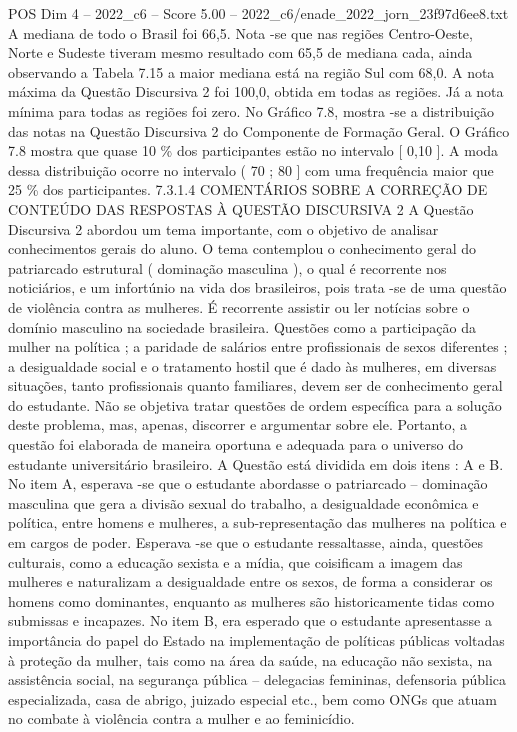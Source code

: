 \begin{textsample}{POS Dim 4 – 2022\_c6 – Score 5.00 – 2022\_c6/enade\_2022\_jorn\_23f97d6ee8.txt}
A mediana de todo o Brasil foi 66,5.
Nota -se que nas regiões Centro-Oeste, Norte e Sudeste tiveram mesmo resultado com 65,5 de mediana cada, ainda observando a Tabela 7.15 a maior mediana está na região Sul com 68,0.
A nota máxima da Questão Discursiva 2 foi 100,0, obtida em todas as regiões.
Já a nota mínima para todas as regiões foi zero.
No Gráfico 7.8, mostra -se a distribuição das notas na Questão Discursiva 2 do Componente de Formação Geral.
O Gráfico 7.8 mostra que quase 10 \% dos participantes estão no intervalo [ 0,10 ].
A moda dessa distribuição ocorre no intervalo ( 70 ; 80 ] com uma frequência maior que 25 \% dos participantes. 7.3.1.4 COMENTÁRIOS SOBRE A CORREÇÃO DE CONTEÚDO DAS RESPOSTAS À QUESTÃO DISCURSIVA 2 A Questão Discursiva 2 abordou um tema importante, com o objetivo de analisar conhecimentos gerais do aluno.
O tema contemplou o conhecimento geral do patriarcado estrutural ( dominação masculina ), o qual é recorrente nos noticiários, e um infortúnio na vida dos brasileiros, pois trata -se de uma questão de violência contra as mulheres.
É recorrente assistir ou ler notícias sobre o domínio masculino na sociedade brasileira.
Questões como a participação da mulher na política ; a paridade de salários entre profissionais de sexos diferentes ; a desigualdade social e o tratamento hostil que é dado às mulheres, em diversas situações, tanto profissionais quanto familiares, devem ser de conhecimento geral do estudante.
Não se objetiva tratar questões de ordem específica para a solução deste problema, mas, apenas, discorrer e argumentar sobre ele.
Portanto, a questão foi elaborada de maneira oportuna e adequada para o universo do estudante universitário brasileiro.
A Questão está dividida em dois itens : A e B.
No item A, esperava -se que o estudante abordasse o patriarcado – dominação masculina que gera a divisão sexual do trabalho, a desigualdade econômica e política, entre homens e mulheres, a sub-representação das mulheres na política e em cargos de poder.
Esperava -se que o estudante ressaltasse, ainda, questões culturais, como a educação sexista e a mídia, que coisificam a imagem das mulheres e naturalizam a desigualdade entre os sexos, de forma a considerar os homens como dominantes, enquanto as mulheres são historicamente tidas como submissas e incapazes.
No item B, era esperado que o estudante apresentasse a importância do papel do Estado na implementação de políticas públicas voltadas à proteção da mulher, tais como na área da saúde, na educação não sexista, na assistência social, na segurança pública – delegacias femininas, defensoria pública especializada, casa de abrigo, juizado especial etc., bem como ONGs que atuam no combate à violência contra a mulher e ao feminicídio.

\end{textsample}
